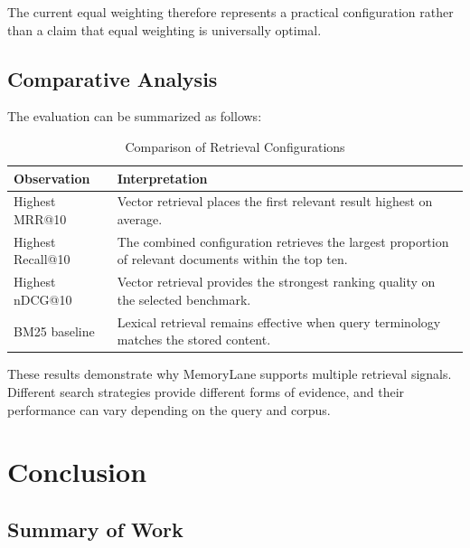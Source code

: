 \documentclass{tietreport}
\begin{document}
The current equal weighting therefore represents a practical
configuration rather than a claim that equal weighting is
universally optimal.

\section{Comparative Analysis}

The evaluation can be summarized as follows:

\begin{table}[H]
\centering
\begin{tabular}{p{} p{}}
\toprule
\textbf{Observation} & \textbf{Interpretation} \\
\midrule

Highest MRR@10 &
Vector retrieval places the first relevant result highest on
average. \\

Highest Recall@10 &
The combined configuration retrieves the largest proportion of
relevant documents within the top ten. \\

Highest nDCG@10 &
Vector retrieval provides the strongest ranking quality on the
selected benchmark. \\

BM25 baseline &
Lexical retrieval remains effective when query terminology
matches the stored content. \\

\bottomrule
\end{tabular}
\caption{Comparison of Retrieval Configurations}
\label{tab:comparison}
\end{table}

These results demonstrate why MemoryLane supports multiple
retrieval signals. Different search strategies provide
different forms of evidence, and their performance can vary
depending on the query and corpus.


\chapter{Conclusion}

\section{Summary of Work}
\end{document}

